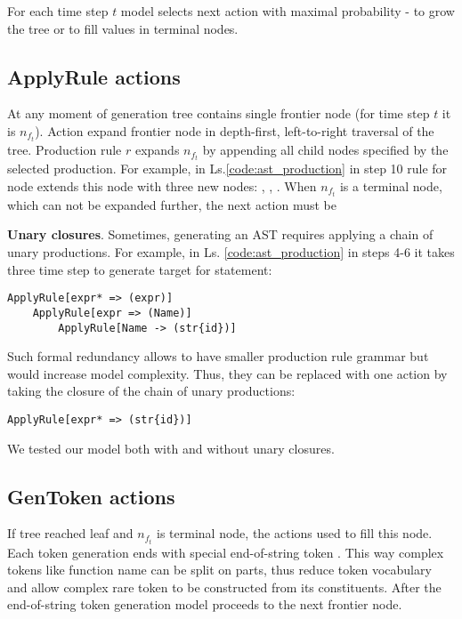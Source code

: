 For each time step $t$ model selects next action with maximal probability -  to grow the tree or  to fill values in terminal nodes. 

\subsection{ApplyRule actions}

At any moment of generation tree contains single frontier node (for time step $t$ it is $n_{f_t}$). Action  expand frontier node in depth-first, left-to-right traversal of the tree. Production rule $r$ expands $n_{f_t}$ by appending all child nodes specified by the selected production. For example, in Ls.\ref{code:ast_production} in step 10 rule for node  extends this node with three new nodes: , , . 
When $n_{f_t}$ is a terminal node, which can not be expanded further, the next action must be 

\textbf{Unary closures}. Sometimes, generating an AST requires applying a chain of unary productions. For example, in Ls. \ref{code:ast_production} in steps 4-6 it takes three time step to generate target for  statement:

\begin{verbatim}
ApplyRule[expr* => (expr)]
    ApplyRule[expr => (Name)]
        ApplyRule[Name -> (str{id})]
\end{verbatim}
Such formal redundancy allows to have smaller production rule grammar but would increase model complexity. Thus, they can be replaced with one action by taking the closure of the chain of unary productions:
\begin{verbatim}
ApplyRule[expr* => (str{id})]
\end{verbatim}

We tested our model both with and without unary closures.

\subsection{GenToken actions}
If tree reached leaf and $n_{f_t}$ is terminal node, the  actions used to fill this node. Each token generation ends with special end-of-string token . This way complex tokens like function name  can be split on parts, thus reduce token vocabulary and allow complex rare token to be constructed from its constituents. After the end-of-string token generation model proceeds to the next frontier node.

